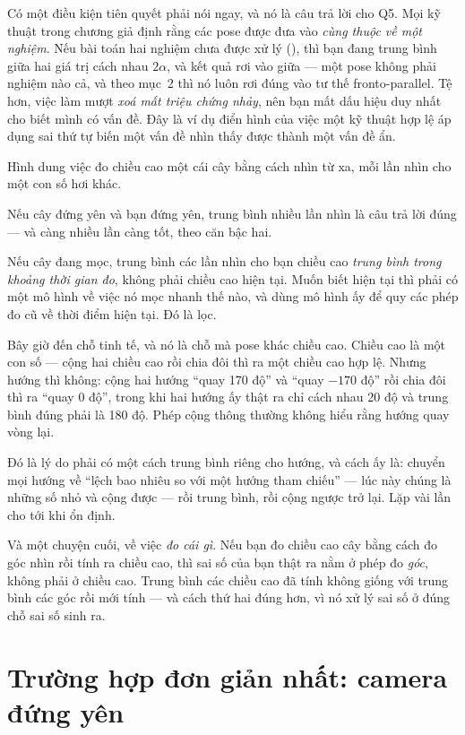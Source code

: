\documentclass[../../marker.tex]{subfiles}
\begin{document}
Có một điều kiện tiên quyết phải nói ngay, và nó là câu trả lời cho Q5. Mọi kỹ thuật trong chương giả định rằng các pose được đưa vào \emph{cùng thuộc về một nghiệm}. Nếu bài toán hai nghiệm chưa được xử lý (), thì bạn đang trung bình giữa hai giá trị cách nhau \(2\alpha\), và kết quả rơi vào giữa --- một pose không phải nghiệm nào cả, và theo  mục~2 thì nó luôn rơi đúng vào tư thế fronto-parallel. Tệ hơn, việc làm mượt \emph{xoá mất triệu chứng nhảy}, nên bạn mất dấu hiệu duy nhất cho biết mình có vấn đề. Đây là ví dụ điển hình của việc một kỹ thuật hợp lệ áp dụng sai thứ tự biến một vấn đề nhìn thấy được thành một vấn đề ẩn.

\begin{trucgiac}
Hình dung việc đo chiều cao một cái cây bằng cách nhìn từ xa, mỗi lần nhìn cho một con số hơi khác.

Nếu cây đứng yên và bạn đứng yên, trung bình nhiều lần nhìn là câu trả lời đúng --- và càng nhiều lần càng tốt, theo căn bậc hai.

Nếu cây đang mọc, trung bình các lần nhìn cho bạn chiều cao \emph{trung bình trong khoảng thời gian đo}, không phải chiều cao hiện tại. Muốn biết hiện tại thì phải có một mô hình về việc nó mọc nhanh thế nào, và dùng mô hình ấy để quy các phép đo cũ về thời điểm hiện tại. Đó là lọc.

Bây giờ đến chỗ tinh tế, và nó là chỗ mà pose khác chiều cao. Chiều cao là một con số --- cộng hai chiều cao rồi chia đôi thì ra một chiều cao hợp lệ. Nhưng hướng thì không: cộng hai hướng ``quay 170 độ'' và ``quay \(-170\) độ'' rồi chia đôi thì ra ``quay 0 độ'', trong khi hai hướng ấy thật ra chỉ cách nhau 20 độ và trung bình đúng phải là 180 độ. Phép cộng thông thường không hiểu rằng hướng quay vòng lại.

Đó là lý do phải có một cách trung bình riêng cho hướng, và cách ấy là: chuyển mọi hướng về ``lệch bao nhiêu so với một hướng tham chiếu'' --- lúc này chúng là những số nhỏ và cộng được --- rồi trung bình, rồi cộng ngược trở lại. Lặp vài lần cho tới khi ổn định.

Và một chuyện cuối, về việc \emph{đo cái gì}. Nếu bạn đo chiều cao cây bằng cách đo góc nhìn rồi tính ra chiều cao, thì sai số của bạn thật ra nằm ở phép đo \emph{góc}, không phải ở chiều cao. Trung bình các chiều cao đã tính không giống với trung bình các góc rồi mới tính --- và cách thứ hai đúng hơn, vì nó xử lý sai số ở đúng chỗ sai số sinh ra.
\end{trucgiac}

\section{Trường hợp đơn giản nhất: camera đứng yên}
\end{document}
